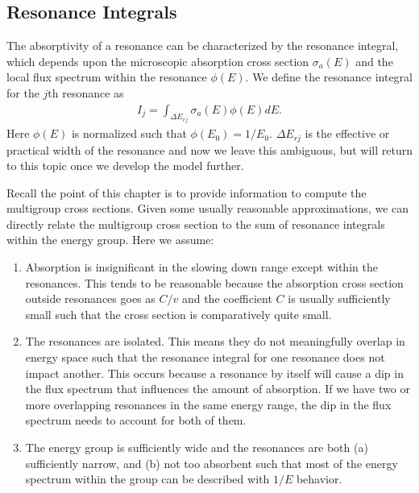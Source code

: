 \subsection{Resonance Integrals}

The absorptivity of a resonance can be characterized by the resonance integral, which depends upon the microscopic absorption cross section $\sigma_a(E)$ and the local flux spectrum within the resonance $\phi(E)$. We define the resonance integral for the $j$th resonance as
\begin{align}
  I_j = \int_{\Delta E_{rj}} \sigma_a(E) \phi(E) dE .
\end{align}
Here $\phi(E)$ is normalized such that $\phi(E_0) = 1/E_0$. $\Delta E_{rj}$ is the effective or practical width of the resonance and now we leave this ambiguous, but will return to this topic once we develop the model further.

Recall the point of this chapter is to provide information to compute the multigroup cross sections. Given some usually reasonable approximations, we can directly relate the multigroup cross section to the sum of resonance integrals within the energy group. Here we assume:
\begin{enumerate}
  \item Absorption is insignificant in the slowing down range except within the resonances. This tends to be reasonable because the absorption cross section outside resonances goes as $C/v$ and the coefficient $C$ is usually sufficiently small such that the cross section is comparatively quite small.
  \item The resonances are isolated. This means they do not meaningfully overlap in energy space such that the resonance integral for one resonance does not impact another. This occurs because a resonance by itself will cause a dip in the flux spectrum that influences the amount of absorption. If we have two or more overlapping resonances in the same energy range, the dip in the flux spectrum needs to account for both of them.
  \item The energy group is sufficiently wide and the resonances are both (a) sufficiently narrow, and (b) not too absorbent such that most of the energy spectrum within the group can be described with $1/E$ behavior.
\end{enumerate}

